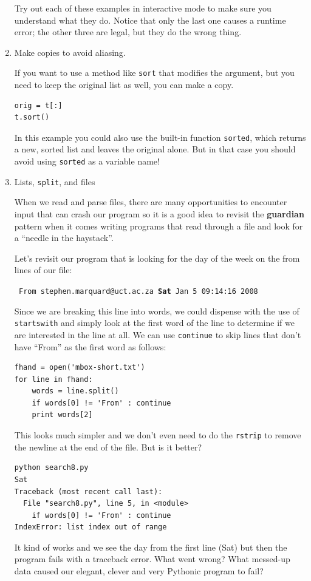 \documentclass[10pt]{book}
\begin{document}
\begin{enumerate}
Try out each of these examples in interactive mode to make sure
you understand what they do.  Notice that only the last
one causes a runtime error; the other three are legal, but they
do the wrong thing.


\item Make copies to avoid aliasing.


If you want to use a method like {\tt sort} that modifies
the argument, but you need to keep the original list as
well, you can make a copy.

\beforeverb
\begin{verbatim}
orig = t[:]
t.sort()
\end{verbatim}
\afterverb

In this example you could also use the built-in function {\tt sorted},
which returns a new, sorted list and leaves the original alone.
But in that case you should avoid using {\tt sorted} as a variable
name!

\item Lists, {\tt split}, and files

When we read and parse files, there are many opportunities
to encounter input that can crash our program so it is a good 
idea to revisit the {\bf guardian} pattern when it comes
writing programs that read through a file 
and look for a ``needle in the haystack''.

Let's revisit our program that is looking for the day of the
week on the from lines of our file:

{\tt
From stephen.marquard@uct.ac.za {\bf Sat} Jan  5 09:14:16 2008
}

Since we are breaking this line into words, we could dispense
with the use of {\tt startswith} and simply look at the 
first word of the line to determine if we are interested
in the line at all.  We can use {\tt continue} to skip lines
that don't have ``From'' as the first word as follows:

\beforeverb
\begin{verbatim}
fhand = open('mbox-short.txt')
for line in fhand:
    words = line.split()
    if words[0] != 'From' : continue
    print words[2]
\end{verbatim}
\afterverb
%
This looks much simpler and we don't even need to do the 
{\tt rstrip} to remove the newline at the end of the file.
But is it better?

\beforeverb
\begin{verbatim}
python search8.py 
Sat
Traceback (most recent call last):
  File "search8.py", line 5, in <module>
    if words[0] != 'From' : continue
IndexError: list index out of range
\end{verbatim}
\afterverb
%
It kind of works and we see the day from the first line
(Sat) but then the program fails with a traceback error.
What went wrong?  What messed-up data caused our elegant, 
clever and very Pythonic program to fail?


\end{enumerate}
\end{document}
